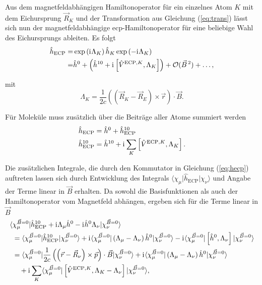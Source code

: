 	Aus dem magnetfeldabhängigen Hamiltonoperator für ein einzelnes Atom $K$ mit dem Eichursprung $\vec{R}_K$ und der Transformation aus Gleichung (\ref{eq:trans}) lässt sich nun der magnetfeldabhängige \ac{ecp}-Hamiltonoperator für eine beliebige Wahl des Eichursprungs ableiten. Es folgt
	\begin{equation}
	\begin{aligned}
	\hat{h}_{\textrm{ECP}}=&\exp\left(\mathrm{i}\mkern1mu\Lambda_K\right)\hat{h}_K\exp\left(-\mathrm{i}\mkern1mu\Lambda_K\right)\\
	=&\hat{h}^0+\left(\hat{h}^{10}+\mathrm{i}\mkern1mu\left[\hat{V}^{\textrm{ECP},K},\Lambda_K\right]\right)+\mathcal{O}(\vec{B}^{\,2})+\dotsc,
	\end{aligned}
	\end{equation}
	
	mit
	\begin{equation}
	\Lambda_K=\frac{1}{2c}\left(\left(\vec{R}_K-\vec{R}_E\right)\times\vec{r}\right)\cdot\vec{B}.
	\end{equation}
	
	Für Moleküle muss zusätzlich über die Beiträge aller Atome summiert werden
	\begin{equation}\label{eq:hecp}
	\begin{aligned}
	&\hat{h}_{\textrm{ECP}}=\hat{h}^0+\hat{h}_{\textrm{ECP}}^{10}\\
	&\hat{h}_{\textrm{ECP}}^{10}=\hat{h}^{10}+\mathrm{i}\mkern1mu\sum_K\left[\hat{V}^{\textrm{ECP},K},\Lambda_K\right].
	\end{aligned}
	\end{equation}	
	 
	Die zusätzlichen Integrale, die durch den Kommutator in Gleichung (\ref{eq:hecp}) auftreten lassen sich durch Entwicklung des Integrals $\langle\chi_\mu\vert\hat{h}_{\textrm{ECP}}\vert\chi_\nu\rangle$ und Angabe der Terme linear in $\vec{B}$ erhalten. Da sowohl die Basisfunktionen als auch der Hamiltonoperator vom Magnetfeld abhängen, ergeben sich für die Terme linear in $\vec{B}$	
	\begin{equation}\label{eq:linearinb}
	\begin{aligned}
	\langle &\chi_\mu^{\vec{B}=0}\vert\hat{h}_{\textrm{ECP}}^{10}+\mathrm{i}\mkern1mu\Lambda_\mu\hat{h}^0-\mathrm{i}\mkern1mu\hat{h}^0\Lambda_\nu\vert\chi_\nu^{\vec{B}=0}\rangle\\
	&=\langle \chi_\mu^{\vec{B}=0}\vert\hat{h}_{\textrm{ECP}}^{10}\vert\chi_\nu^{\vec{B}=0}\rangle+\mathrm{i}\mkern1mu\langle\chi_\mu^{\vec{B}=0}\vert\left(\Lambda_\mu -\Lambda_\nu\right)\hat{h}^0\vert\chi_\nu^{\vec{B}=0}\rangle-\mathrm{i}\mkern1mu\langle\chi_\mu^{\vec{B}=0}\vert\left[\hat{h}^0 ,\Lambda_\nu\right]\vert\chi_\nu^{\vec{B}=0}\rangle\\
    &=\langle \chi_\mu^{\vec{B}=0}\vert\frac{1}{2c}\left(\left(\vec{r}-\vec{R}_\nu\right)\times\vec{p}\right)\cdot\vec{B}\vert\chi_\nu^{\vec{B}=0}\rangle
    +\mathrm{i}\mkern1mu\langle\chi_\mu^{\vec{B}=0}\vert\left(\Lambda_\mu -\Lambda_\nu\right)\hat{h}^0\vert\chi_\nu^{\vec{B}=0}\rangle\\
    &\quad+\mathrm{i}\mkern1mu\sum_K\langle \chi_\mu^{\vec{B}=0}\vert\left[\hat{V}^{\textrm{ECP},K},\Lambda_K-\Lambda_\nu\right]\vert\chi_\nu^{\vec{B}=0}\rangle,
	\end{aligned}
	\end{equation}
	
